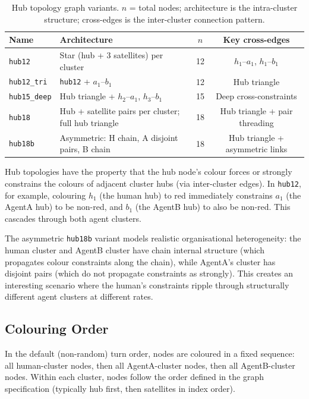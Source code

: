 \documentclass[11pt]{article}
\theoremstyle{definition}
\newcommand{\AgentA}{\textsf{AgentA}}
\newcommand{\AgentB}{\textsf{AgentB}}
\begin{document}
\begin{table}[h]
\centering
\caption{Hub topology graph variants.  $n$ = total nodes; architecture is
         the intra-cluster structure; cross-edges is the inter-cluster connection pattern.}
\label{tab:hub_graphs}
\begin{tabular}{llcc}
\toprule
\textbf{Name} & \textbf{Architecture} & $n$ & \textbf{Key cross-edges} \\
\midrule
\texttt{hub12}      & Star (hub + 3 satellites) per cluster & 12 & $h_1$--$a_1$, $h_1$--$b_1$ \\
\texttt{hub12\_tri} & \texttt{hub12} + $a_1$--$b_1$                                  & 12 & Hub triangle \\
\texttt{hub15\_deep}& Hub triangle + $h_2$--$a_1$, $h_3$--$b_1$                    & 15 & Deep cross-constraints \\
\texttt{hub18}      & Hub + satellite pairs per cluster; full hub triangle           & 18 & Hub triangle + pair threading \\
\texttt{hub18b}     & Asymmetric: H chain, A disjoint pairs, B chain                & 18 & Hub triangle + asymmetric links \\
\bottomrule
\end{tabular}
\end{table}

Hub topologies have the property that the hub node's colour forces or strongly
constrains the colours of adjacent cluster hubs (via inter-cluster edges).  In
\texttt{hub12}, for example, colouring $h_1$ (the human hub) to red immediately
constrains $a_1$ (the \AgentA{} hub) to be non-red, and $b_1$ (the \AgentB{} hub) to
also be non-red.  This cascades through both agent clusters.

The asymmetric \texttt{hub18b} variant models realistic organisational heterogeneity:
the human cluster and \AgentB{} cluster have chain internal structure (which propagates
colour constraints along the chain), while \AgentA{}'s cluster has disjoint pairs
(which do not propagate constraints as strongly).  This creates an interesting
scenario where the human's constraints ripple through structurally different agent
clusters at different rates.

\subsection{Colouring Order}

In the default (non-random) turn order, nodes are coloured in a fixed sequence:
all human-cluster nodes, then all \AgentA-cluster nodes, then all \AgentB-cluster nodes.
Within each cluster, nodes follow the order defined in the graph specification (typically
hub first, then satellites in index order).
\end{document}
